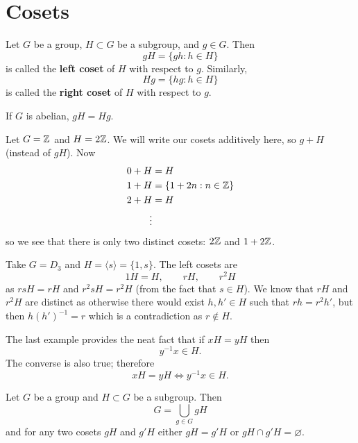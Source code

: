 \section{Cosets}

\begin{definition}[Coset]
    Let $G$ be a group, $H \subset G$ be a subgroup, and $g \in G$.
    Then
    \[
        gH = \{gh : h \in H\}
    \]
    is called the \textbf{left coset} of $H$ with respect to $g$.
    Similarly,
    \[
        Hg = \{hg: h \in H\}
    \]
    is called the \textbf{right coset} of $H$ with respect to $g$.
\end{definition}

\begin{remark}
    If $G$ is abelian, $gH = Hg$.
\end{remark}

\begin{example}
    Let $G = \mathbb{Z}$ and $H = 2\mathbb{Z}$.
    We will write our cosets additively here, so $g + H$ (instead of $gH$).
    Now
    \begin{align*}
        0 + H &= H \\
        1 + H &= \{1 + 2n: n \in \mathbb{Z}\} \\
        2 + H &= H \\
        \vdots
    \end{align*}
    so we see that there is only two distinct cosets:
    $2\mathbb{Z}$ and $1 + 2\mathbb{Z}$.
\end{example}

\begin{example}
    Take $G = D_3$ and $H = \langle s \rangle = \{1,s\}$.
    The left cosets are
    \[
        1H = H, \qquad rH, \qquad r^2H
    \]
    as $rsH = rH$ and $r^2sH = r^2H$ (from the fact that $s \in H$).
    We know that $rH$ and $r^2H$ are distinct as otherwise there would exist
    $h, h' \in H$ such that $rh = r^2h'$, but then $h(h')^{-1} = r$
    which is a contradiction as $r \not \in H$.
\end{example}

\begin{remark}
    The last example provides the neat fact that if $xH = yH$ then
    \[
        y^{-1}x \in H.
    \]
    The converse is also true; therefore
    \[
        xH = yH \iff y^{-1}x \in H.
    \]
\end{remark}

\begin{lemma}[]
    Let $G$ be a group and $H \subset G$ be a subgroup.
    Then
    \[
        G = \bigcup_{g \in G} gH
    \]
    and for any two cosets $gH$ and $g'H$ either
    $gH = g'H$ or $gH \cap g'H = \varnothing$.
\end{lemma}

